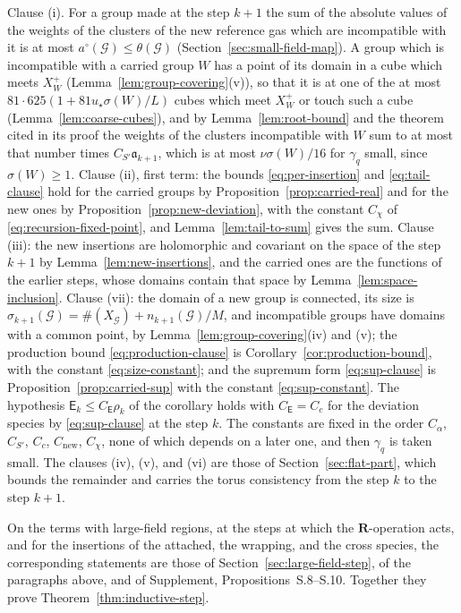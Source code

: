 \documentclass[11pt]{preprint}
\numberwithin{equation}{section}
\theoremstyle{definition}
\theoremstyle{remark}
\theoremstyle{plain}
\begin{document}
Clause (i). For a group made at the step $k + 1$ the sum of the absolute values of the weights of the clusters of the new reference gas which are incompatible with it is at most $a^\circ(\mathcal G) \leq \theta(\mathcal G)$ (Section~\ref{sec:small-field-map}). A group which is incompatible with a carried group $W$ has a point of its domain in a cube which meets $X^+_W$ (Lemma~\ref{lem:group-covering}(v)), so that it is at one of the at most $81 \cdot 625(1 + 81u_\star\sigma(W)/L)$ cubes which meet $X^+_W$ or touch such a cube (Lemma~\ref{lem:coarse-cubes}), and by Lemma~\ref{lem:root-bound} and the theorem cited in its proof the weights of the clusters incompatible with $W$ sum to at most that number times $C_{S'}\mathfrak a_{k+1}$, which is at most $\nu\sigma(W)/16$ for $\gamma_q$ small, since $\sigma(W) \geq 1$. Clause (ii), first term: the bounds \eqref{eq:per-insertion} and \eqref{eq:tail-clause} hold for the carried groups by Proposition~\ref{prop:carried-real} and for the new ones by Proposition~\ref{prop:new-deviation}, with the constant $C_\chi$ of \eqref{eq:recursion-fixed-point}, and Lemma~\ref{lem:tail-to-sum} gives the sum. Clause (iii): the new insertions are holomorphic and covariant on the space of the step $k + 1$ by Lemma~\ref{lem:new-insertions}, and the carried ones are the functions of the earlier steps, whose domains contain that space by Lemma~\ref{lem:space-inclusion}. Clause (vii): the domain of a new group is connected, its size is $\sigma_{k+1}(\mathcal G) = \#(X_{\mathcal G}) + n_{k+1}(\mathcal G)/M$, and incompatible groups have domains with a common point, by Lemma~\ref{lem:group-covering}(iv) and (v); the production bound \eqref{eq:production-clause} is Corollary~\ref{cor:production-bound}, with the constant \eqref{eq:size-constant}; and the supremum form \eqref{eq:sup-clause} is Proposition~\ref{prop:carried-sup} with the constant \eqref{eq:sup-constant}. The hypothesis $\mathsf E_k \leq C_{\mathsf E}\rho_k$ of the corollary holds with $C_{\mathsf E} = C_c$ for the deviation species by \eqref{eq:sup-clause} at the step $k$. The constants are fixed in the order $C_\alpha$, $C_{S'}$, $C_c$, $C_{\mathrm{new}}$, $C_\chi$, none of which depends on a later one, and then $\gamma_q$ is taken small. The clauses (iv), (v), and (vi) are those of Section~\ref{sec:flat-part}, which bounds the remainder and carries the torus consistency from the step $k$ to the step $k + 1$.

On the terms with large-field regions, at the steps at which the $\mathbf R$-operation acts, and for the insertions of the attached, the wrapping, and the cross species, the corresponding statements are those of Section~\ref{sec:large-field-step}, of the paragraphs above, and of Supplement, Propositions~S.8--S.10. Together they prove Theorem~\ref{thm:inductive-step}.
\end{document}
